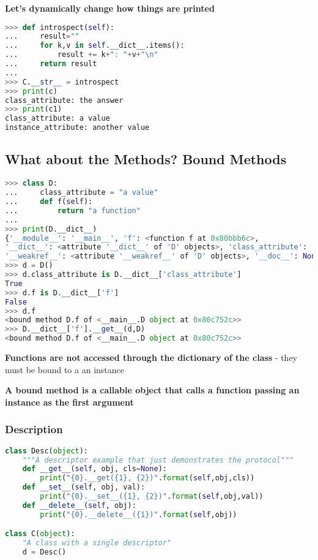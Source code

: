 \textbf{Let’s dynamically change how things are printed}

\begin{lstlisting}[language=Python]
>>> def introspect(self):
... 	result=""
... 	for k,v in self.__dict__.items():
... 		result += k+": "+v+"\n"
... 	return result
...
>>> C.__str__ = introspect
>>> print(c)
class_attribute: the answer
>>> print(c1)
class_attribute: a value
instance_attribute: another value
\end{lstlisting}

\subsection{What about the Methods? Bound Methods}

\begin{lstlisting}[language=Python]
>>> class D:
... 	class_attribute = "a value"
... 	def f(self):
... 		return "a function"
...
>>> print(D.__dict__)
{'__module__': '__main__', 'f': <function f at 0x80bbb6c>,
'__dict__': <attribute '__dict__' of 'D' objects>, 'class_attribute': 'a value',
'__weakref__': <attribute '__weakref__' of 'D' objects>, '__doc__': None}
>>> d = D()
>>> d.class_attribute is D.__dict__['class_attribute']
True
>>> d.f is D.__dict__['f']
False
>>> d.f
<bound method D.f of <__main__.D object at 0x80c752c>>
>>> D.__dict__['f'].__get__(d,D)
<bound method D.f of <__main__.D object at 0x80c752c>>
\end{lstlisting}

\textbf{Functions are not accessed through the dictionary of the class}
	- they must be bound to a an instance

\textbf{A bound method is a callable object that calls a function passing an instance as the first argument}

\subsubsection{Description}

\begin{lstlisting}[language=Python]
class Desc(object):
	"""A descriptor example that just demonstrates the protocol"""
	def __get__(self, obj, cls=None):
		print("{0}.__get({1}, {2})".format(self,obj,cls))
	def __set__(self, obj, val):
		print("{0}.__set__({1}, {2})".format(self,obj,val))
	def __delete__(self, obj):
		print("{0}.__delete__({1})".format(self,obj))

class C(object):
	"A class with a single descriptor"
	d = Desc()
\end{lstlisting}

